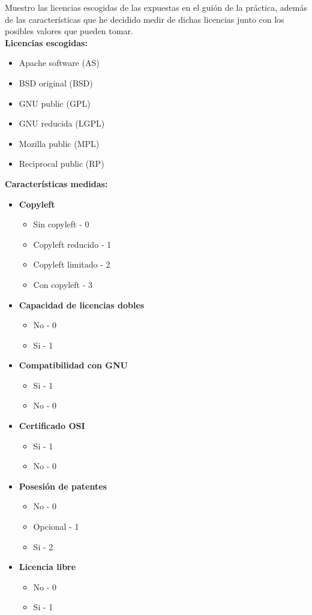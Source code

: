 Muestro las licencias escogidas de las expuestas en el guión de la práctica, además de las características que he decidido medir de dichas licencias junto con los posibles valores que pueden tomar.
\\
\textbf{Licencias escogidas:}
\begin{itemize}
	\item Apache software (AS)
	\item BSD original (BSD)
	\item GNU public (GPL)
	\item GNU reducida (LGPL)
	\item Mozilla public (MPL)
	\item Reciprocal public (RP) 
\end{itemize}

\textbf{Características medidas:}
\begin{itemize}
	\item \textbf{Copyleft} 
		\begin{itemize}
			\item Sin copyleft - 0
			\item Copyleft reducido - 1 
			\item Copyleft limitado - 2
			\item Con copyleft - 3
		\end{itemize}
	\item \textbf{Capacidad de licencias dobles}
		\begin{itemize}
			\item No - 0
			\item Si - 1
		\end{itemize}
	\item \textbf{Compatibilidad con GNU}
		\begin{itemize}
			\item Si - 1
			\item No - 0 
		\end{itemize}
	\item \textbf{Certificado OSI}
		\begin{itemize}
			\item Si - 1
			\item No - 0
		\end{itemize}
	\item \textbf{Posesión de patentes}
		\begin{itemize}
			\item No - 0
			\item Opcional - 1
			\item Si - 2 
		\end{itemize}
	\item \textbf{Licencia libre}
		\begin{itemize}
			\item No - 0
			\item Si - 1
		\end{itemize}
\end{itemize}

